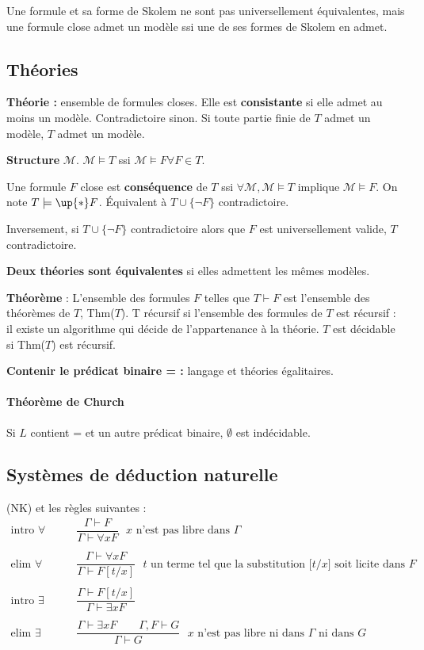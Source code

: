 \documentclass[french]{article}
\begin{document}
Une formule et sa forme de Skolem ne sont pas universellement équivalentes, mais une formule close admet un modèle ssi une de ses formes de Skolem en admet.

\subsection{Théories}
\textbf{Théorie :} ensemble de formules closes. Elle est \textbf{consistante} si elle admet au moins un modèle. Contradictoire sinon. Si toute partie finie de $T$ admet un modèle, $T$ admet un modèle.

\textbf{Structure} $\mathcal{M}$. $\mathcal{M}\models T$ ssi $\mathcal{M}\models F\forall F\in T$.

Une formule $F$ close est \textbf{conséquence} de $T$ ssi $\forall\mathcal{M}, \mathcal{M}\models T$ implique $\mathcal{M}\models F$. On note $T\models\up{*} F$. Équivalent à $T\cup\{\neg F\}$ contradictoire.

Inversement, si $T\cup\{\neg F\}$ contradictoire alors que $F$ est universellement valide, $T$ contradictoire.

\textbf{Deux théories sont équivalentes} si elles admettent les mêmes modèles.

\textbf{Théorème} : L'ensemble des formules $F$ telles que $T\vdash F$ est l'ensemble des théorèmes de $T$, Thm($T$). T récursif si l'ensemble des formules de $T$ est récursif : il existe un algorithme qui décide de l'appartenance à la théorie. $T$ est décidable si Thm($T$) est récursif.

\textbf{Contenir le prédicat binaire = :} langage et théories égalitaires.

\paragraph{Théorème de Church} Si $L$ contient = et un autre prédicat binaire, $\emptyset$ est indécidable.


\subsection{Systèmes de déduction naturelle}
(NK) et les règles suivantes :
\begin{align*}
\text{intro $\forall$} &\qquad\dfrac{\Gamma\vdash F}{\Gamma\vdash\forall x F}\text{ $x$ n'est pas libre dans $\Gamma$}\\
\\
\text{elim $\forall$} &\qquad\dfrac{\Gamma\vdash\forall x F}{\Gamma\vdash F[t/x]}\text{ $t$ un terme tel que la substitution [$t$/$x$] soit licite dans $F$}\\
\\
\text{intro $\exists$} &\qquad\dfrac{\Gamma\vdash F[t/x]}{\Gamma\vdash\exists x F}\\
\\
\text{elim $\exists$} &\qquad\dfrac{\Gamma\vdash\exists x F\qquad\Gamma, F\vdash G}{\Gamma\vdash G}\text{ $x$ n'est pas libre ni dans $\Gamma$ ni dans $G$}
\end{align*}
\end{document}
